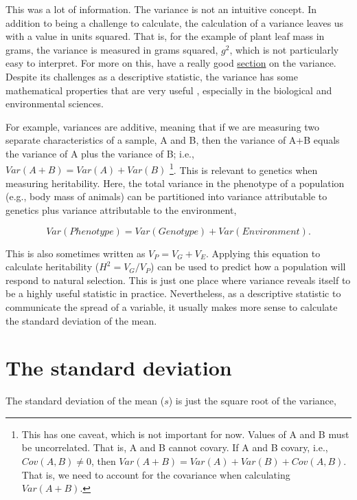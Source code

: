 \documentclass[
]{scrbook}
\begin{document}
This was a lot of information.
The variance is not an intuitive concept.
In addition to being a challenge to calculate, the calculation of a variance leaves us with a value in units squared.
That is, for the example of plant leaf mass in grams, the variance is measured in grams squared, \(g^{2}\), which is not particularly easy to interpret.
For more on this, \citet{Navarro2022} have a really good \href{https://davidfoxcroft.github.io/lsj-book/04-Descriptive-statistics.html\#variance}{section} on the variance.
Despite its challenges as a descriptive statistic, the variance has some mathematical properties that are very useful \citep{Navarro2022}, especially in the biological and environmental sciences.

For example, variances are additive, meaning that if we are measuring two separate characteristics of a sample, A and B, then the variance of A+B equals the variance of A plus the variance of B; i.e., \(Var(A + B) = Var(A) + Var(B)\) \footnote{This has one caveat, which is not important for now. Values of A and B must be uncorrelated. That is, A and B cannot covary. If A and B covary, i.e., \(Cov(A, B) \neq 0\), then \(Var(A+B) = Var(A) + Var(B) + Cov(A, B)\). That is, we need to account for the covariance when calculating \(Var(A+B)\).}.
This is relevant to genetics when measuring heritability.
Here, the total variance in the phenotype of a population (e.g., body mass of animals) can be partitioned into variance attributable to genetics plus variance attributable to the environment,

\[Var(Phenotype) = Var(Genotype) + Var(Environment).\]

This is also sometimes written as \(V_{P} = V_{G} + V_{E}\).
Applying this equation to calculate heritability (\(H^{2} = V_{G} / V_{P}\)) can be used to predict how a population will respond to natural selection.
This is just one place where variance reveals itself to be a highly useful statistic in practice.
Nevertheless, as a descriptive statistic to communicate the spread of a variable, it usually makes more sense to calculate the standard deviation of the mean.

\hypertarget{the-standard-deviation}{%
\section{The standard deviation}\label{the-standard-deviation}}

The standard deviation of the mean (\(s\)) is just the square root of the variance,
\end{document}
